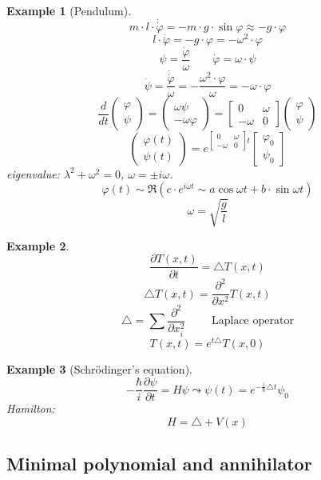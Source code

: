 \documentclass[a4paper]{article}
\numberwithin{lecref}{section}
\newtheorem*{Example}{Example}
\newcommand{\vectwo}[2]{\begin{pmatrix} #1 \\ #2 \end{pmatrix}}
\begin{document}
\begin{Example}[Pendulum]
  \[ m \cdot l \cdot \dot{\dot{\varphi}} = -m \cdot g \cdot \sin{\varphi} \approx -g \cdot \varphi \]
  \[ l \cdot \ddot{\ddot{\varphi}} = -g \cdot \varphi = -\omega^2 \cdot \varphi \]
  \[ \psi = \frac{\dot{\varphi}}{\omega} \qquad \dot{\varphi} = \omega \cdot \psi \]
  \[ \dot{\psi} = \frac{\dot{\dot{\varphi}}}{\omega} = -\frac{\omega^2 \cdot \varphi}{\omega} = -\omega \cdot \varphi \]
  \[ \frac{d}{dt} \vectwo{\varphi}{\psi} = \vectwo{\omega \psi}{-\omega \varphi} = \begin{bmatrix} 0 & \omega \\ -\omega & 0 \end{bmatrix} \vectwo{\varphi}{\psi} \]
  \[ \begin{pmatrix} \varphi(t) \\ \psi(t) \end{pmatrix} = e^{\begin{bmatrix} 0 & \omega \\ -\omega & 0 \end{bmatrix} t} \begin{bmatrix} \varphi_0 \\ \psi_0 \end{bmatrix} \]
  eigenvalue: $\lambda^2 + \omega^2 = 0$, $\omega = \pm i\omega$.
  \[ \varphi(t) \sim \Re(c \cdot e^{i \omega t} \sim a \cos{\omega t} + b \cdot \sin{\omega t}) \]
  \[ \omega = \sqrt{\frac{g}{l}} \]
\end{Example}

\begin{Example}
  \[ \frac{\partial T(x,t)}{\partial t} = \triangle T(x, t) \]
  \[ \triangle T(x, t) = \frac{\partial^2}{\partial x^2} T(x, t) \]
  \[ \triangle = \sum \frac{\partial^2}{\partial x_i^2} \qquad \text{ Laplace operator} \]
  \[ T(x, t) = e^{t \triangle} T(x, 0) \]
\end{Example}

\begin{Example}[Schr\"odinger's equation]
  \[ -\frac{\hbar}{i} \frac{\partial \psi}{\partial t} = H\psi \leadsto \psi(t) = e^{-\frac i{\hbar} \triangle t} \psi_0 \]
  Hamilton:
  \[ H = \triangle + V(x) \]
\end{Example}

\subsection{Minimal polynomial and annihilator}
\end{document}
